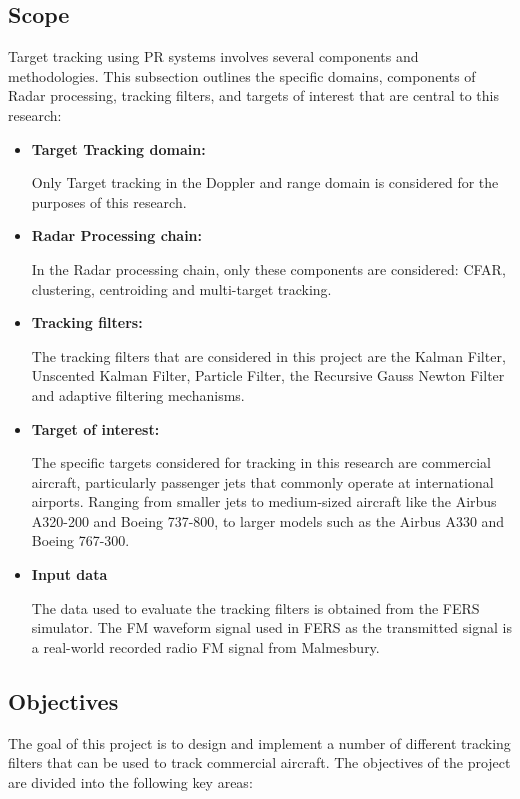 \subsection{Scope}
Target tracking using \ac{PR} systems involves several components and methodologies. This subsection outlines the specific domains, components of \ac{Radar} processing, tracking filters, and targets of interest that are central to this research:
\begin{itemize}
    \item \textbf{Target Tracking domain:} 

     Only Target tracking in the Doppler and range domain is considered for the purposes of this research.
     
    \item \textbf{Radar Processing chain:}
    
     In the \ac{Radar} processing chain, only these components are considered: \ac{CFAR}, clustering, centroiding and multi-target tracking.
    
    \item \textbf{Tracking filters:}

    The tracking filters that are considered in this project are the Kalman Filter, Unscented Kalman Filter, Particle Filter, the Recursive Gauss Newton Filter and adaptive filtering mechanisms. 

    \item \textbf{Target of interest:}

    The specific targets considered for tracking in this research are commercial aircraft, particularly passenger jets that commonly operate at international airports. Ranging from smaller jets to medium-sized aircraft like the Airbus A320-200 and Boeing 737-800, to larger models such as the Airbus A330 and Boeing 767-300.

    \item \textbf{Input data}

    The data used to evaluate the tracking filters is obtained from the \ac{FERS} simulator. The \ac{FM} waveform signal used in \ac{FERS} as the transmitted signal is a real-world recorded radio \ac{FM} signal from Malmesbury.

\end{itemize}


\subsection{Objectives}
The goal of this project is to design and implement a number of different tracking filters that can be used to track commercial aircraft. The objectives of the project are divided into the following key areas:


